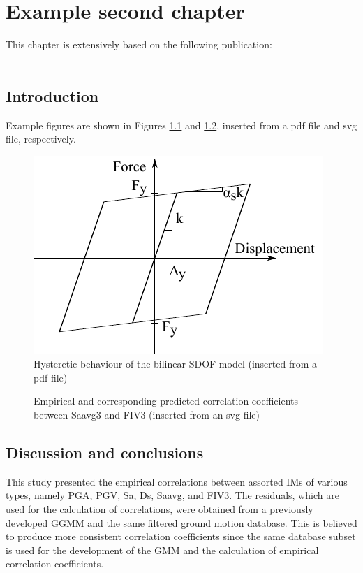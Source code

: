 \chapter{Example second chapter}
\label{chapter:second_ch}

This chapter is extensively based on the following publication:\\
\\

\section{Introduction}

Example figures are shown in Figures \ref{sdof_bilinear_model} and \ref{Saavg3_FIV3_empirical_predicted_total_correlation}, inserted from a pdf file and svg file, respectively.

\begin{figure}
	\centering
	\includegraphics{figures_ch2/sdof_bilinear_model.pdf} %
	\caption{Hysteretic behaviour of the bilinear \gls{SDOF} model (inserted from a pdf file)}
	\label{sdof_bilinear_model}
\end{figure}

\begin{figure}
	\centering
	
	\caption{Empirical and corresponding predicted correlation coefficients between \gls{Saavg3} and \gls{FIV3} (inserted from an svg file)}
	\label{Saavg3_FIV3_empirical_predicted_total_correlation}
\end{figure}

\section{Discussion and conclusions}

This study presented the empirical correlations between assorted \glspl{IM} of various types, namely \gls{PGA}, \gls{PGV}, \gls{Sa}, \gls{Ds}, \gls{Saavg}, and \gls{FIV3}. The residuals, which are used for the calculation of correlations, were obtained from a previously developed \gls{GGMM} and the same filtered ground motion database. This is believed to produce more consistent correlation coefficients since the same database subset is used for the development of the \gls{GMM} and the calculation of empirical correlation coefficients.


